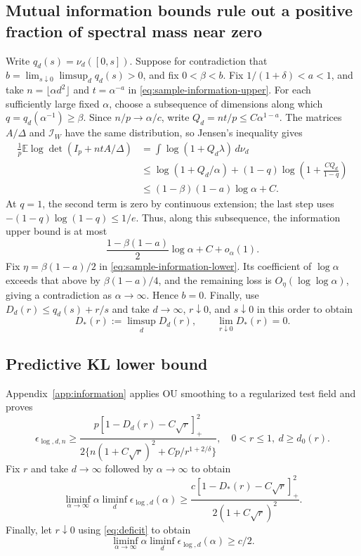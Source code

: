 \documentclass[a4paper]{tufte-handout}
\newcommand{\E}{\mathbb E}
\begin{document}
\begin{fullwidth}
\subsection{Mutual information bounds rule out a positive fraction of spectral mass near zero}
Write $q_d(s)=\nu_d([0,s])$. Suppose for contradiction that
$b=\lim_{s\downarrow0}\limsup_dq_d(s)>0$, and fix $0<\beta<b$.
Fix $1/(1+\delta)<a<1$, and take
$n=\lfloor\alpha d^2\rfloor$ and $t=\alpha^{-a}$ in \eqref{eq:sample-information-upper}.
For each sufficiently large fixed $\alpha$, choose a subsequence of dimensions along which
$q=q_d(\alpha^{-1})\ge\beta$.
Since $n/p\to\alpha/c$, write $Q_d=nt/p\le C\alpha^{1-a}$.
The matrices $A/\Delta$ and $\mathcal I_W$ have the same distribution, so Jensen's inequality gives
\[
 \begin{aligned}
 \frac1p\E\log\det(I_p+ntA/\Delta)
 &=\int\log(1+Q_d\lambda)\,d\nu_d\\
 &\le\log(1+Q_d/\alpha)
 +(1-q)\log\left(1+\frac{CQ_d}{1-q}\right)\\
 &\le(1-\beta)(1-a)\log\alpha+C.
 \end{aligned}
\]
At $q=1$, the second term is zero by continuous extension; the last step uses
$-(1-q)\log(1-q)\le1/e$. Thus, along this subsequence, the information upper bound is at most
\[
 \frac{1-\beta(1-a)}2\log\alpha+C+o_\alpha(1).
\]
Fix $\eta=\beta(1-a)/2$ in \eqref{eq:sample-information-lower}.
Its coefficient of $\log\alpha$ exceeds that above by $\beta(1-a)/4$, and the remaining loss is
$O_\eta(\log\log\alpha)$, giving a contradiction as $\alpha\to\infty$. Hence $b=0$.
Finally, use $D_d(r)\le q_d(s)+r/s$ and take $d\to\infty$,
$r\downarrow0$, and $s\downarrow0$ in this order to obtain
\begin{equation}\label{eq:deficit}
 D_*(r):=\limsup_dD_d(r),\qquad \lim_{r\downarrow0}D_*(r)=0.
\end{equation}

\subsection{Predictive KL lower bound}
Appendix~\ref{app:information} applies OU smoothing to a regularized test field and proves
\begin{equation}\label{eq:lower-unified}
\epsilon_{\log,d,n}\ge
\frac{p[1-D_d(r)-C\sqrt r]_+^2}
{2\{n(1+C\sqrt r)^2+Cp/r^{1+2/\delta}\}},\quad 0<r\le1,\ d\ge d_0(r).
\end{equation}
Fix $r$ and take $d\to\infty$ followed by $\alpha\to\infty$ to obtain
\[
 \liminf_{\alpha\to\infty}\alpha\liminf_d\epsilon_{\log,d}(\alpha)
 \ge \frac{c[1-D_*(r)-C\sqrt r]_+^2}{2(1+C\sqrt r)^2}.
\]
Finally, let $r\downarrow0$ using \eqref{eq:deficit} to obtain
\begin{equation}\label{eq:lower-final}
\liminf_{\alpha\to\infty}\alpha\liminf_d\epsilon_{\log,d}(\alpha)\ge c/2.
\end{equation}


\end{fullwidth}
\end{document}
